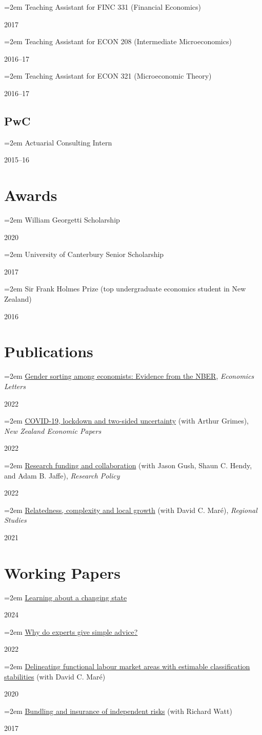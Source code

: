 \documentclass[11pt,oneside]{memoir}
\newcommand{\entry}[2]{\par\parbox[t]{0.9\linewidth}{\strut\raggedright\hangindent=2em #2\strut}\hfill#1}
\begin{document}
		\entry{2017}{Teaching Assistant for FINC 331 (Financial Economics)}
		\entry{2016--17}{Teaching Assistant for ECON 208 (Intermediate Microeconomics)}
		\entry{2016--17}{Teaching Assistant for ECON 321 (Microeconomic Theory)}
	
	\subsection{PwC}
	
		\entry{2015--16}{Actuarial Consulting Intern}
	
	\section{Awards}
	
		\entry{2020}{William Georgetti Scholarship}
		\entry{2017}{University of Canterbury Senior Scholarship}
		\entry{2016}{Sir Frank Holmes Prize (top undergraduate economics student in New Zealand)}
	
	\section{Publications}
	
		\entry{2022}{\href{https://doi.org/10.1016/j.econlet.2022.110640}{Gender sorting among economists: Evidence from the NBER}, \emph{Economics Letters}}
		\entry{2022}{\href{https://doi.org/10.1080/00779954.2020.1806340}{COVID-19, lockdown and two-sided uncertainty} (with Arthur Grimes), \emph{New Zealand Economic Papers}}
		\entry{2022}{\href{https://doi.org/10.1016/j.respol.2021.104421}{Research funding and collaboration} (with Jason Gush, Shaun C. Hendy, and Adam B. Jaffe), \emph{Research Policy}}
		\entry{2021}{\href{https://doi.org/10.1080/00343404.2020.1802418}{Relatedness, complexity and local growth} (with David C. Maré), \emph{Regional Studies}}
	
	\section{Working Papers}
	
		\entry{2024}{\href{https://arxiv.org/abs/2401.03607}{Learning about a changing state}}
		\entry{2022}{\href{https://arxiv.org/abs/2209.11710}{Why do experts give simple advice?}}
		\entry{2020}{\href{https://www.iza.org/publications/dp/13642}{Delineating functional labour market areas with estimable classification stabilities} (with David C. Maré)}
		\entry{2017}{\href{https://ideas.repec.org/p/cbt/econwp/17-05.html}{Bundling and insurance of independent risks} (with Richard Watt)}
	
\end{document}
